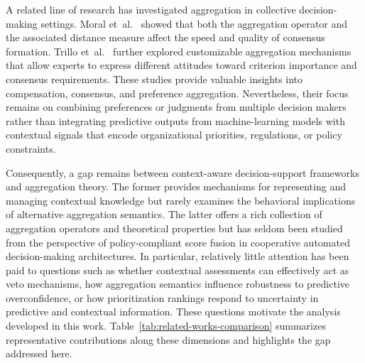 \documentclass[mathematics,article,submit,moreauthors]{Definitions/mdpi}
\begin{document}
A related line of research has investigated aggregation in collective
decision-making settings. Moral et~al.~\cite{MoralEtAl2017} showed that
both the aggregation operator and the associated distance measure affect
the speed and quality of consensus formation. Trillo
et~al.~\cite{TrilloEtAl2023} further explored customizable aggregation
mechanisms that allow experts to express different attitudes toward
criterion importance and consensus requirements. These studies provide
valuable insights into compensation, consensus, and preference
aggregation. Nevertheless, their focus remains on combining preferences
or judgments from multiple decision makers rather than integrating
predictive outputs from machine-learning models with contextual signals
that encode organizational priorities, regulations, or policy
constraints.

Consequently, a gap remains between context-aware decision-support
frameworks and aggregation theory. The former provides mechanisms for
representing and managing contextual knowledge but rarely examines the
behavioral implications of alternative aggregation semantics. The latter
offers a rich collection of aggregation operators and theoretical
properties but has seldom been studied from the perspective of
policy-compliant score fusion in cooperative automated decision-making
architectures. In particular, relatively little attention has been paid
to questions such as whether contextual assessments can effectively act
as veto mechanisms, how aggregation semantics influence robustness to
predictive overconfidence, or how prioritization rankings respond to
uncertainty in predictive and contextual information. These questions
motivate the analysis developed in this work. Table~\ref{tab:related-works-comparison}
summarizes representative contributions along these dimensions and
highlights the gap addressed here.
\end{document}
